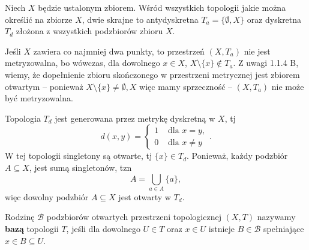 \begin{eg}[1.2.3.]
	Niech $X$ będzie ustalonym zbiorem. Wśród wszystkich topologii jakie można określić na zbiorze $X$, dwie skrajne to antydyskretna $T_{a} = \{\emptyset, X\} $ oraz dyskretna $T_{d}$ złożona z wszystkich podzbiorów zbioru $X$. 

	Jeśli $X$ zawiera co najmniej dwa punkty, to przestrzeń $\left( X, T_{a} \right) $ nie jest metryzowalna, bo wówczas, dla dowolnego $x \in X$, $X\setminus \{x\}  \not\in T_{a}$. Z uwagi 1.1.4 B, wiemy, że dopełnienie zbioru skończonego w przestrzeni metrycznej jest zbiorem otwartym -- ponieważ $X\setminus \{x\} \neq \emptyset, X$ więc mamy sprzeczność -- $\left( X,T_{a} \right) $ nie może być metryzowalna. 

Topologia $T_{d}$ jest generowana przez metrykę dyskretną w $X$, tj
 \[
d\left( x,y \right) = \begin{cases}
	1 &\text{ dla } x = y,\\
	0 &\text{ dla } x \neq y
\end{cases}
.\] 
W tej topologii singletony są otwarte, tj $\{x\} \in T_{d}$. Ponieważ, każdy podzbiór $A \subseteq X$, jest sumą singletonów, tzn
\[
A = \bigcup_{a \in A} \{a\} 
,\] 
więc dowolny podzbiór $A \subseteq X$ jest otwarty w $T_{d}$.
\end{eg} 
\begin{definition}
	Rodzinę $\mathcal{B}$ podzbiorów otwartych przestrzeni topologicznej $\left( X,T \right) $ nazywamy \textbf{bazą} topologii $T$, jeśli dla dowolnego $U \in T$ oraz $x\in U$ istnieje $B \in \mathcal{B}$ spełniające $x \in B \subseteq U$.
\end{definition} 


